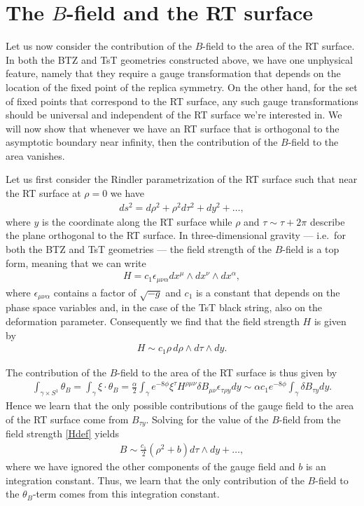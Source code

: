 \documentclass[11pt,a4paper]{article}
\def\a{\alpha}
\def\we{\wedge}
\newcommand{\eq}[1]{\begin{align}#1\end{align}}
\begin{document}





\section{The $B$-field and the RT surface}

Let us now consider the contribution of the $B$-field to the area of the RT surface. In both the BTZ and TsT geometries constructed above, we have one unphysical feature, namely that they require a gauge transformation that depends on the location of the fixed point of the replica symmetry. On the other hand, for the set of fixed points that correspond to the RT surface, any such gauge transformations should be universal and independent of the RT surface we're interested in. We will now show that whenever we have an RT surface that is orthogonal to the asymptotic boundary near infinity, then the contribution of the $B$-field to the area vanishes.

Let us first consider the Rindler parametrization of the RT surface such that near the RT surface at $\rho = 0$ we have
\eq{
ds^2 = d\rho^2 + \rho^2 d\tau^2 + dy^2 + \dots,
}
where $y$ is the coordinate along the RT surface while $\rho$ and $\tau \sim \tau + 2 \pi$ describe the plane orthogonal to the RT surface. In three-dimensional gravity --- i.e.~for both the BTZ and TsT geometries --- the field strength of the $B$-field is a top form, meaning that we can write
\eq{
H = c_1 \epsilon_{\mu\nu\a} dx^{\mu} \we dx^{\nu} \we dx^{\alpha},
}
where $\epsilon_{\mu\nu\a}$ contains a factor of $\sqrt{-g}$ and $c_1$ is a constant that depends on the phase space variables and, in the case of the TsT black string, also on the deformation parameter. Consequently we find that the field strength $H$ is given by
\eq{
H \sim c_1 \rho\, d\rho \we d \tau \we  d y. \label{Hdef}
}

The contribution of the $B$-field to the area of the RT surface is thus given by
\eq{
\int_{\gamma \times S^1} \theta_B = \int_\gamma \xi \cdot \theta_B = \frac{\a}{2} \int_\gamma e^{-8\phi} \xi^\tau H^{\rho\mu\nu} \delta B_{\mu\nu}\epsilon_{\tau \rho y}dy \sim \a c_1 e^{-8\phi} \int_\gamma \delta B_{\tau y} dy.
}
Hence we learn that the only possible contributions of the gauge field to the area of the RT surface come from $B_{\tau y}$. Solving for the value of the $B$-field from the field strength \eqref{Hdef} yields
\eq{
B \sim \frac{c_1}{2} ( \rho^2 + b) d\tau \we dy + \dots, \label{Bfieldbootstrap}
}
where we have ignored the other components of the gauge field and $b$ is an integration constant. Thus, we learn that the only contribution of the $B$-field to the $\theta_B$-term comes from this integration constant. 
\end{document}
